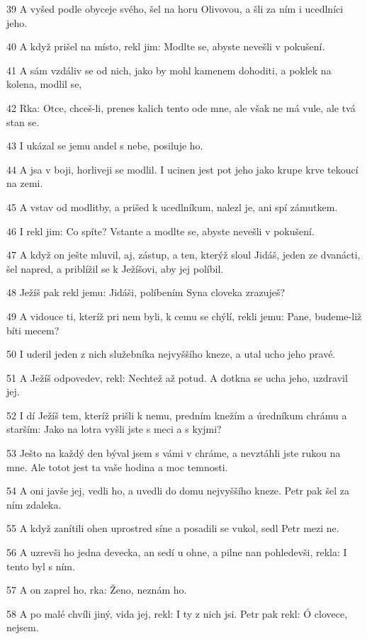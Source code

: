 \par 39 A vyšed podle obyceje svého, šel na horu Olivovou, a šli za ním i ucedlníci jeho.
\par 40 A když prišel na místo, rekl jim: Modlte se, abyste nevešli v pokušení.
\par 41 A sám vzdáliv se od nich, jako by mohl kamenem dohoditi, a poklek na kolena, modlil se,
\par 42 Rka: Otce, chceš-li, prenes kalich tento ode mne, ale však ne má vule, ale tvá stan se.
\par 43 I ukázal se jemu andel s nebe, posiluje ho.
\par 44 A jsa v boji, horliveji se modlil. I ucinen jest pot jeho jako krupe krve tekoucí na zemi.
\par 45 A vstav od modlitby, a prišed k ucedlníkum, nalezl je, ani spí zámutkem.
\par 46 I rekl jim: Co spíte? Vstante a modlte se, abyste nevešli v pokušení.
\par 47 A když on ješte mluvil, aj, zástup, a ten, kterýž sloul Jidáš, jeden ze dvanácti, šel napred, a priblížil se k Ježíšovi, aby jej políbil.
\par 48 Ježíš pak rekl jemu: Jidáši, políbením Syna cloveka zrazuješ?
\par 49 A vidouce ti, kteríž pri nem byli, k cemu se chýlí, rekli jemu: Pane, budeme-liž bíti mecem?
\par 50 I uderil jeden z nich služebníka nejvyššího kneze, a utal ucho jeho pravé.
\par 51 A Ježíš odpovedev, rekl: Nechtež až potud. A dotkna se ucha jeho, uzdravil jej.
\par 52 I dí Ježíš tem, kteríž prišli k nemu, predním knežím a úredníkum chrámu a starším: Jako na lotra vyšli jste s meci a s kyjmi?
\par 53 Ješto na každý den býval jsem s vámi v chráme, a nevztáhli jste rukou na mne. Ale totot jest ta vaše hodina a moc temnosti.
\par 54 A oni javše jej, vedli ho, a uvedli do domu nejvyššího kneze. Petr pak šel za ním zdaleka.
\par 55 A když zanítili ohen uprostred síne a posadili se vukol, sedl Petr mezi ne.
\par 56 A uzrevši ho jedna devecka, an sedí u ohne, a pilne nan pohledevši, rekla: I tento byl s ním.
\par 57 A on zaprel ho, rka: Ženo, neznám ho.
\par 58 A po malé chvíli jiný, vida jej, rekl: I ty z nich jsi. Petr pak rekl: Ó clovece, nejsem.
